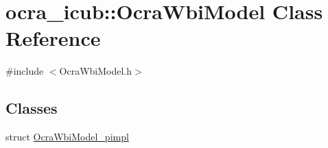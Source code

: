 \hypertarget{classocra__icub_1_1OcraWbiModel}{\section{ocra\-\_\-icub\-:\-:\-Ocra\-Wbi\-Model \-Class \-Reference}
\label{classocra__icub_1_1OcraWbiModel}
}


{\ttfamily \#include $<$\-Ocra\-Wbi\-Model.\-h$>$}

\subsection*{\-Classes}
\begin{DoxyCompactItemize}
\item 
struct \hyperlink{structOcraWbiModel_1_1OcraWbiModel__pimpl}{\-Ocra\-Wbi\-Model\-\_\-pimpl}
\end{DoxyCompactItemize}
